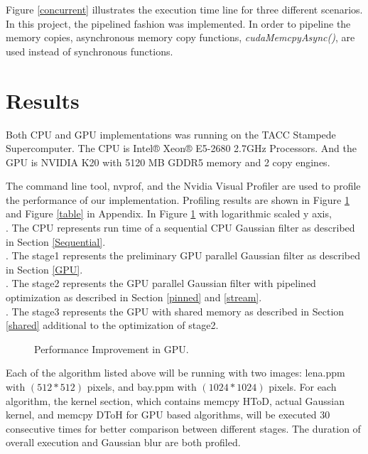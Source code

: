 \documentclass[journal,11pt,onecolumn,draftclsnofoot]{ieeeconf}  %
\begin{document}
Figure \ref{concurrent} illustrates the execution time line for three different scenarios. In this project, the pipelined fashion was implemented. In order to pipeline the memory copies, asynchronous memory copy functions, \textit{cudaMemcpyAsync()}, are used instead of synchronous functions.\cite{Stream} \par

\section{Results}
Both CPU and GPU implementations was running on the TACC Stampede Supercomputer. The CPU is Intel® Xeon® E5-2680 2.7GHz Processors. And the GPU is NVIDIA K20 with 5120 MB GDDR5 memory and 2 copy engines. \par
The command line tool, nvprof, and the Nvidia Visual Profiler are used to profile the performance of our implementation. Profiling results are shown in Figure \ref{performances} and Figure \ref{table} in Appendix. In Figure \ref{performances} with logarithmic scaled y axis,\\ 
.	The CPU represents run time of a sequential CPU Gaussian filter as described in Section \ref{Sequential}.\\
.	The stage1 represents the preliminary GPU parallel Gaussian filter as described in Section \ref{GPU}.\\
.	The stage2 represents the GPU parallel Gaussian filter with pipelined optimization as described in Section \ref{pinned} and \ref{stream}.\\
.     The stage3 represents the GPU with shared memory as described in Section \ref{shared} additional to the optimization of stage2.\\

\begin{figure}[h]
		\vspace*{-5mm}
	\caption{Performance Improvement in GPU.}
	\label{performances}
	\vspace*{-5mm}
\end{figure}
Each of the algorithm listed above will be running with two images: lena.ppm with $(512*512)$ pixels, and bay.ppm with $(1024*1024)$ pixels. For each algorithm, the kernel section, which contains memcpy HToD, actual Gaussian kernel, and memcpy DToH for GPU based algorithms, will be executed 30 consecutive times for better comparison between different stages. The duration of overall execution and Gaussian blur are both profiled. \par
\end{document}
